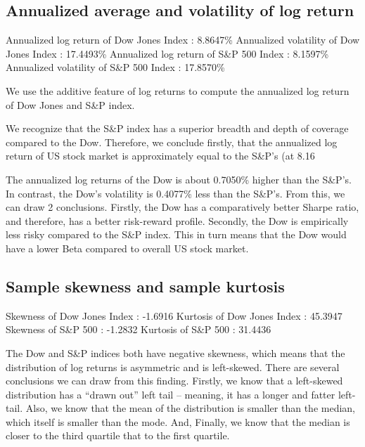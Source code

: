 \documentclass[a4paper]{article}
\begin{document}
\subsection{Annualized average and volatility of log return}
\begin{flushleft}
Annualized log return of Dow Jones Index : 8.8647\% \linebreak 
Annualized volatility of Dow Jones Index : 17.4493\% \linebreak 
Annualized log return of S\&P 500 Index : 8.1597\% \linebreak 
Annualized volatility of S\&P 500 Index : 17.8570\% \linebreak 
\end{flushleft}

We use the additive feature of log returns to compute the annualized log return of Dow Jones and S\&P index. 

We recognize that the S\&P index has a superior breadth and depth of coverage compared to the Dow. Therefore, we conclude firstly, that the annualized log return of US stock market is approximately equal to the S\&P’s (at 8.16%

The annualized log returns of the Dow is about 0.7050\% higher than the S\&P’s. In contrast, the Dow’s volatility is 0.4077\% less than the S\&P’s. From this, we can draw 2 conclusions. Firstly, the Dow has a comparatively better Sharpe ratio, and therefore, has a better risk-reward profile. Secondly, the Dow is empirically less risky compared to the S\&P index. This in turn means that the Dow would have a lower Beta compared to overall US stock market.


\subsection{Sample skewness and sample kurtosis}
\begin{flushleft}
Skewness of Dow Jones Index : -1.6916 \linebreak
Kurtosis of Dow Jones Index : 45.3947 \linebreak
Skewness of S\&P 500 : -1.2832 \linebreak
Kurtosis of S\&P 500 : 31.4436 \linebreak
\end{flushleft}

The Dow and S\&P indices both have negative skewness, which means that the distribution of log returns is asymmetric and is left-skewed. There are several conclusions we can draw from this finding. Firstly, we know that a left-skewed distribution has a “drawn out” left tail – meaning, it has a longer and fatter left-tail. Also, we know that the mean of the distribution is smaller than the median, which itself is smaller than the mode. And, Finally, we know that the median is closer to the third quartile that to the first quartile. 
\end{document}
